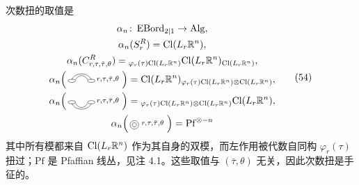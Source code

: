 \begin{definition}
次数扭的取值是
\begin{equation}
\begin{gathered}
\alpha_n\colon\EBord_{2|1}\to\Alg,\\
\alpha_n(S^R_r)=\mathrm{Cl}(L_r\R^n),\\
\alpha_n(C^R_{r,\tau,\bar\tau,\theta})={}_{\varphi_r(\tau)\mathrm{Cl}(L_r\R^n)}\mathrm{Cl}(L_r\R^n)_{\mathrm{Cl}(L_r\R^n)},\\
\alpha_n\Big(\,\tikz[baseline=-0.35ex,line width=0.35pt,scale=0.32]{
\draw (0,0) ellipse (0.42 and 0.18);
\draw (2.2,0) ellipse (0.42 and 0.18);
\draw (0,0.14) .. controls (0.35,1.0) and (1.85,1.0) .. (2.2,0.14);
\draw (0.42,0.12) .. controls (0.75,0.75) and (1.45,0.75) .. (1.78,0.12);
\node[anchor=base west,inner sep=1.4pt] at (2.62,0.02) {$\scriptstyle r,\tau,\bar\tau,\theta$};
}\,\Big)=\mathrm{Cl}(L_r\R^n)_{\varphi_r(\tau)\mathrm{Cl}(L_r\R^n)\otimes\mathrm{Cl}(L_r\R^n)},\\
\alpha_n\Big(\,\tikz[baseline=-0.35ex,line width=0.35pt,scale=0.32]{
\draw (0,0) ellipse (0.42 and 0.18);
\draw (2.2,0) ellipse (0.42 and 0.18);
\draw (0,-0.14) .. controls (0.35,-1.0) and (1.85,-1.0) .. (2.2,-0.14);
\draw (0.42,-0.12) .. controls (0.75,-0.75) and (1.45,-0.75) .. (1.78,-0.12);
\node[anchor=base west,inner sep=1.4pt] at (2.62,-0.02) {$\scriptstyle r,\tau,\bar\tau,\theta$};
}\,\Big)={}_{\varphi_r(\tau)\mathrm{Cl}(L_r\R^n)\otimes\mathrm{Cl}(L_r\R^n)}\mathrm{Cl}(L_r\R^n),\\
\alpha_n\Big(\,\tikz[baseline=-0.35ex,line width=0.35pt,scale=0.32]{
\draw (0,0) circle (0.48);
\draw (0,0) circle (0.24);
\node[anchor=base west,inner sep=1.4pt] at (0.62,0) {$\scriptstyle r,\tau,\bar\tau,\theta$};
}\,\Big)=\mathrm{Pf}^{\otimes-n}
\end{gathered}
\tag{54}
\end{equation}
其中所有模都来自 $\mathrm{Cl}(L_r\mathbb{R}^n)$ 作为其自身的双模，而左作用被代数自同构 $\varphi_r(\tau)$ 扭过；$\mathrm{Pf}$ 是 Pfaffian 线丛，见注 4.1。这些取值与 $(\bar\tau,\theta)$ 无关，因此次数扭是手征的。
\end{definition}

